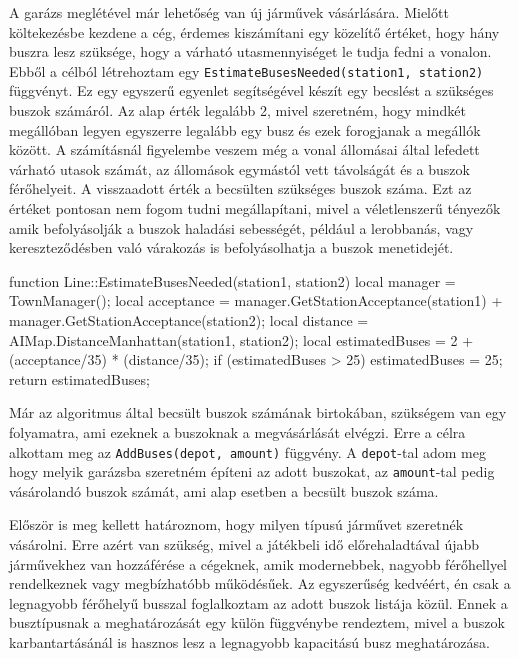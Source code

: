 A garázs meglétével már lehetőség van új járművek vásárlására. Mielőtt költekezésbe kezdene a cég, érdemes kiszámítani egy közelítő értéket, hogy hány buszra lesz szüksége, hogy a várható utasmennyiséget le tudja fedni a vonalon. Ebből a célból létrehoztam egy \texttt{EstimateBusesNeeded(station1, station2)} függvényt. Ez egy egyszerű egyenlet segítségével készít egy becslést a szükséges buszok számáról. Az alap érték legalább 2, mivel szeretném, hogy mindkét megállóban legyen egyszerre legalább egy busz és ezek forogjanak a megállók között. A számításnál figyelembe veszem még a vonal állomásai által lefedett várható utasok számát, az állomások egymástól vett távolságát és a buszok férőhelyeit. A visszaadott érték a becsülten szükséges buszok száma. Ezt az értéket pontosan nem fogom tudni megállapítani, mivel a véletlenszerű tényezők amik befolyásolják a buszok haladási sebességét, például a lerobbanás, vagy kereszteződésben való várakozás is befolyásolhatja a buszok menetidejét.

\begin{cpp}
function Line::EstimateBusesNeeded(station1, station2)
{
  local manager = TownManager();
  local acceptance = manager.GetStationAcceptance(station1) +
   manager.GetStationAcceptance(station2);
  local distance = AIMap.DistanceManhattan(station1, station2);
  local estimatedBuses = 2 + (acceptance/35) * (distance/35);
  if (estimatedBuses > 25) {
    estimatedBuses = 25;
  }
  return estimatedBuses;
}
\end{cpp}

Már az algoritmus által becsült buszok számának birtokában, szükségem van egy folyamatra, ami ezeknek a buszoknak a megvásárlását elvégzi. Erre a célra alkottam meg az \texttt{AddBuses(depot, amount)} függvény. A \texttt{depot}-tal adom meg hogy melyik garázsba szeretném építeni az adott buszokat, az \texttt{amount}-tal pedig vásárolandó buszok számát, ami alap esetben a becsült buszok száma.

Először is meg kellett határoznom, hogy milyen típusú járművet szeretnék vásárolni. Erre azért van szükség, mivel a játékbeli idő előrehaladtával újabb járművekhez van hozzáférése a cégeknek, amik modernebbek, nagyobb férőhellyel rendelkeznek vagy megbízhatóbb működésűek. Az egyszerűség kedvéért, én csak a legnagyobb férőhelyű busszal foglalkoztam az adott buszok listája közül. Ennek a busztípusnak a meghatározását egy külön függvénybe rendeztem, mivel a buszok karbantartásánál is hasznos lesz a legnagyobb kapacitású busz meghatározása.

